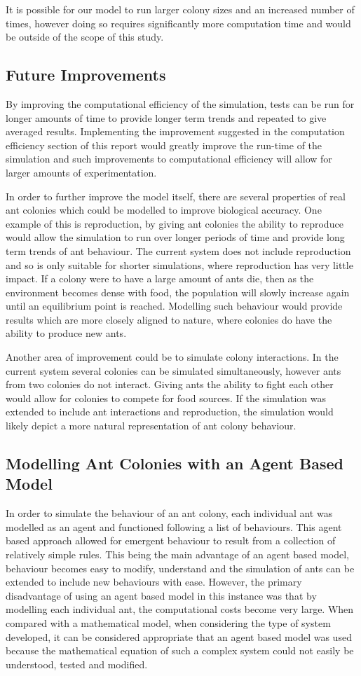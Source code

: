 It is possible for our model to run larger colony sizes and an increased number of times, however doing so requires significantly more computation time and would be outside of the scope of this study.

\subsection{Future Improvements}
By improving the computational efficiency of the simulation, tests can be run for longer amounts of time to provide longer term trends and repeated to give averaged results. Implementing the improvement suggested in the computation efficiency section of this report would greatly improve the run-time of the simulation and such improvements to computational efficiency will allow for larger amounts of experimentation.\par
In order to further improve the model itself, there are several properties of real ant colonies which could be modelled to improve biological accuracy. One example of this is reproduction, by giving ant colonies the ability to reproduce would allow the simulation to run over longer periods of time and provide long term trends of ant behaviour. The current system does not include reproduction and so is only suitable for shorter simulations, where reproduction has very little impact. If a colony were to have a large amount of ants die, then as the environment becomes dense with food, the population will slowly increase again until an equilibrium point is reached. Modelling such behaviour would provide results which are more closely aligned to nature, where colonies do have the ability to produce new ants.\par
Another area of improvement could be to simulate colony interactions. In the current system several colonies can be simulated simultaneously, however ants from two colonies do not interact. Giving ants the ability to fight each other would allow for colonies to compete for food sources. If the simulation was extended to include ant interactions and reproduction, the simulation would likely depict a more natural representation of ant colony behaviour.\par

\subsection{Modelling Ant Colonies with an Agent Based Model}
In order to simulate the behaviour of an ant colony, each individual ant was modelled as an agent and functioned following a list of behaviours. This agent based approach allowed for emergent behaviour to result from a collection of relatively simple rules. This being the main advantage of an agent based model, behaviour becomes easy to modify, understand and the simulation of ants can be extended to include new behaviours with ease. However, the primary disadvantage of using an agent based model in this instance was that by modelling each individual ant, the computational costs become very large. When compared with a mathematical model, when considering the type of system developed, it can be considered appropriate that an agent based model was used because the mathematical equation of such a complex system could not easily be understood, tested and modified.  
